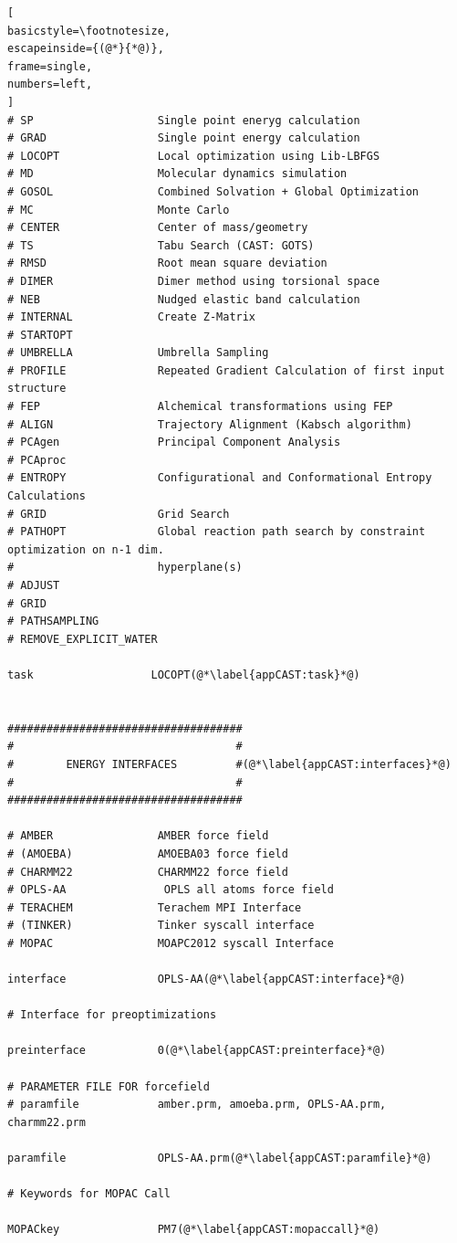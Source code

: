 \documentclass[a4paper,11pt]{scrartcl}
\begin{document}
\begin{lstlisting}[
basicstyle=\footnotesize,
escapeinside={(@*}{*@)},
frame=single,
numbers=left,
]
# SP                   Single point eneryg calculation
# GRAD                 Single point energy calculation
# LOCOPT               Local optimization using Lib-LBFGS
# MD                   Molecular dynamics simulation
# GOSOL                Combined Solvation + Global Optimization
# MC                   Monte Carlo
# CENTER               Center of mass/geometry
# TS                   Tabu Search (CAST: GOTS)
# RMSD                 Root mean square deviation
# DIMER                Dimer method using torsional space
# NEB                  Nudged elastic band calculation
# INTERNAL             Create Z-Matrix
# STARTOPT
# UMBRELLA             Umbrella Sampling
# PROFILE              Repeated Gradient Calculation of first input structure
# FEP                  Alchemical transformations using FEP
# ALIGN                Trajectory Alignment (Kabsch algorithm)
# PCAgen               Principal Component Analysis
# PCAproc
# ENTROPY              Configurational and Conformational Entropy Calculations
# GRID                 Grid Search
# PATHOPT              Global reaction path search by constraint optimization on n-1 dim.
#                      hyperplane(s)
# ADJUST
# GRID
# PATHSAMPLING
# REMOVE_EXPLICIT_WATER

task                  LOCOPT(@*\label{appCAST:task}*@)


####################################
#                                  #
#        ENERGY INTERFACES         #(@*\label{appCAST:interfaces}*@)
#                                  #
####################################

# AMBER                AMBER force field
# (AMOEBA)             AMOEBA03 force field
# CHARMM22             CHARMM22 force field
# OPLS-AA               OPLS all atoms force field
# TERACHEM             Terachem MPI Interface
# (TINKER)             Tinker syscall interface
# MOPAC                MOAPC2012 syscall Interface

interface              OPLS-AA(@*\label{appCAST:interface}*@)

# Interface for preoptimizations

preinterface           0(@*\label{appCAST:preinterface}*@)

# PARAMETER FILE FOR forcefield
# paramfile            amber.prm, amoeba.prm, OPLS-AA.prm, charmm22.prm

paramfile              OPLS-AA.prm(@*\label{appCAST:paramfile}*@)

# Keywords for MOPAC Call

MOPACkey               PM7(@*\label{appCAST:mopaccall}*@)


\end{lstlisting}
\end{document}
